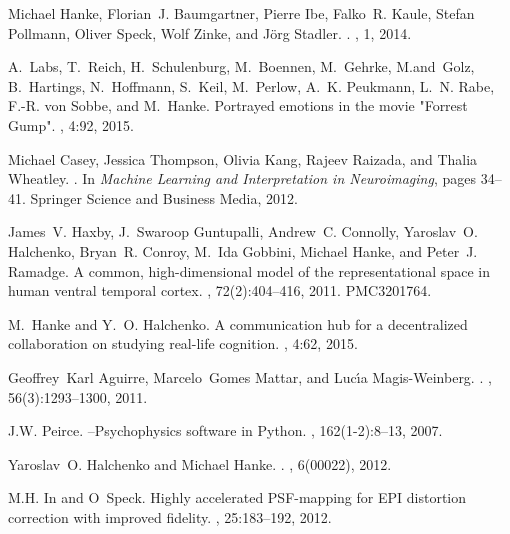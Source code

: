 \documentclass[10pt,a4paper,twocolumn]{article}
\begin{document}
%
\begin{thebibliography}{10}

Michael Hanke, Florian~J. Baumgartner, Pierre Ibe, Falko~R. Kaule, Stefan
  Pollmann, Oliver Speck, Wolf Zinke, and Jörg Stadler.
.
, 1, 2014.

A.~Labs, T.~Reich, H.~Schulenburg, M.~Boennen, M.~Gehrke, M.and~Golz,
  B.~Hartings, N.~Hoffmann, S.~Keil, M.~Perlow, A.~K. Peukmann, L.~N. Rabe,
  F.-R. von Sobbe, and M.~Hanke.
\newblock Portrayed emotions in the movie "{Forrest Gump}".
, 4:92, 2015.

Michael Casey, Jessica Thompson, Olivia Kang, Rajeev Raizada, and Thalia
  Wheatley.
.
\newblock In {\em Machine Learning and Interpretation in Neuroimaging}, pages
  34--41. Springer Science and Business Media, 2012.

James~V. Haxby, J.~Swaroop Guntupalli, Andrew~C. Connolly, Yaroslav~O.
  Halchenko, Bryan~R. Conroy, M.~Ida Gobbini, Michael Hanke, and Peter~J.
  Ramadge.
\newblock A common, high-dimensional model of the representational space in
  human ventral temporal cortex.
, 72(2):404--416, 2011.
\newblock PMC3201764.

M.~Hanke and Y.~O. Halchenko.
\newblock A communication hub for a decentralized collaboration on studying
  real-life cognition.
, 4:62, 2015.

Geoffrey~Karl Aguirre, Marcelo~Gomes Mattar, and Luc{\'{\i}}a Magis-Weinberg.
.
, 56(3):1293--1300, 2011.

J.W. Peirce.
--{P}sychophysics software in {P}ython.
, 162(1-2):8--13, 2007.

Yaroslav~O. Halchenko and Michael Hanke.
.
, 6(00022), 2012.

M.H. In and O~Speck.
\newblock Highly accelerated {PSF}-mapping for {EPI} distortion correction with
  improved fidelity.
, 25:183--192, 2012.


\end{thebibliography}
\end{document}
